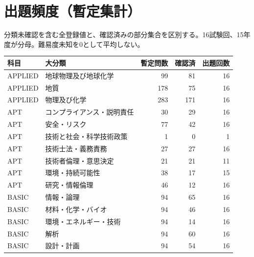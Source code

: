 \chapter{出題頻度（暫定集計）}
分類未確認を含む全登録値と、確認済みの部分集合を区別する。16試験回、15年度が分母。難易度未知を0として平均しない。
\begin{longtable}{p{.16\linewidth}p{.42\linewidth}rrr}
科目 & 大分類 & 暫定問数 & 確認済 & 出題回数\\\hline
APPLIED & 地球物理及び地球化学 & 99 & 81 & 16\\
APPLIED & 地質 & 178 & 75 & 16\\
APPLIED & 物理及び化学 & 283 & 171 & 16\\
APT & コンプライアンス・説明責任 & 30 & 29 & 16\\
APT & 安全・リスク & 77 & 42 & 16\\
APT & 技術と社会・科学技術政策 & 1 & 0 & 1\\
APT & 技術士法・義務責務 & 27 & 27 & 16\\
APT & 技術者倫理・意思決定 & 21 & 21 & 11\\
APT & 環境・持続可能性 & 38 & 17 & 15\\
APT & 研究・情報倫理 & 46 & 12 & 16\\
BASIC & 情報・論理 & 94 & 65 & 16\\
BASIC & 材料・化学・バイオ & 94 & 46 & 16\\
BASIC & 環境・エネルギー・技術 & 94 & 14 & 16\\
BASIC & 解析 & 94 & 60 & 16\\
BASIC & 設計・計画 & 94 & 54 & 16\\
\end{longtable}
